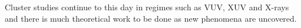 Cluster studies continue to this day in regimes such as VUV\cite{Arbeiter2011},
XUV\cite{Murphy2008a,Murphy2008b,Krikunova2012} and X-rays\cite{Ziaja2009b,Thomas2012,Timneanu2013}
and there is much theoretical work to be done as new phenomena are uncovered.


